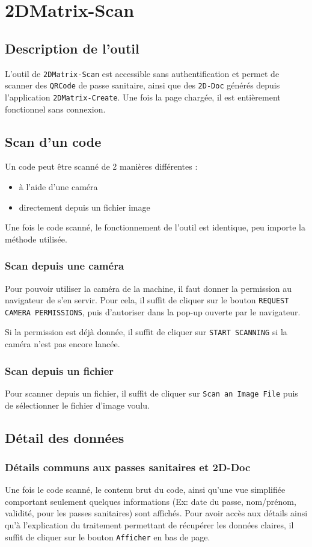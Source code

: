\section{2DMatrix-Scan}
\subsection{Description de l'outil}
L'outil de \texttt{2DMatrix-Scan} est accessible sans authentification et permet de scanner des \texttt{QRCode} de passe sanitaire, ainsi que des \texttt{2D-Doc} générés depuis l'application \texttt{2DMatrix-Create}.
Une fois la page chargée, il est entièrement fonctionnel sans connexion.
\subsection{Scan d'un code}
Un code peut être scanné de 2 manières différentes :
\begin{itemize}
    \item à l'aide d'une caméra
    \item directement depuis un fichier image
\end{itemize}

Une fois le code scanné, le fonctionnement de l'outil est identique, peu importe la méthode utilisée.

\subsubsection{Scan depuis une caméra}
Pour pouvoir utiliser la caméra de la machine, il faut donner la permission au navigateur de s'en servir. Pour cela, il suffit de cliquer sur le bouton \texttt{REQUEST CAMERA PERMISSIONS}, puis d'autoriser dans la pop-up ouverte par le navigateur.

Si la permission est déjà donnée, il suffit de cliquer sur \texttt{START SCANNING} si la caméra n'est pas encore lancée.

\subsubsection{Scan depuis un fichier}
Pour scanner depuis un fichier, il suffit de cliquer sur \texttt{Scan an Image File} puis de sélectionner le fichier d'image voulu.

\subsection{Détail des données}
\subsubsection{Détails communs aux passes sanitaires et 2D-Doc}
Une fois le code scanné, le contenu brut du code, ainsi qu'une vue simplifiée comportant seulement quelques informations (Ex: date du passe, nom/prénom, validité, pour les passes sanitaires) sont affichés. Pour avoir accès aux détails ainsi qu'à l'explication du traitement permettant de récupérer les données claires, il suffit de cliquer sur le bouton \texttt{Afficher} en bas de page.

